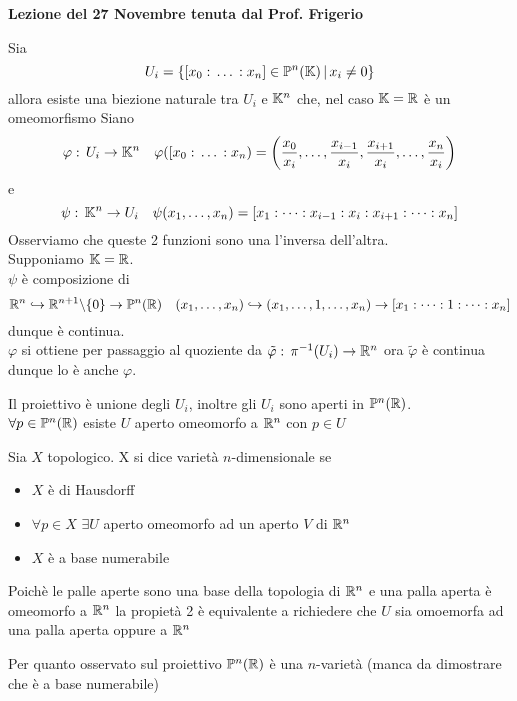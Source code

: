 


\textbf{Lezione del 27 Novembre tenuta dal Prof. Frigerio}
\begin{prop}Sia 
$$ U_i = \{ [x_0:\, \dots \, : x_n ] \in \mathbb{P}^n(\mathbb{K}) \, \vert \, x_i \neq 0 \} $$
allora esiste una biezione naturale tra $U_i$ e $\mathbb{K}^n$ che, nel caso $\mathbb{K}=\mathbb{R}$ \`e un omeomorfismo 
\proof Siano
$$ \varphi:\, U_i \to \mathbb{K}^n \quad \varphi([x_0:\, \dots \, : x_n) = \left( \frac{x_0}{x_i}, \dots , \frac{x_{i-1}}{x_i}, \frac{x_{i+1}}{x_i}, \dots , \frac{x_n }{x_i} \right)$$
e 
$$ \psi:\, \mathbb{K}^n \to U_i \quad \psi( x_1, \dots , x_n ) = [ x_1 : \dots :x_{i-1}: x_i : x_{i+1} : \dots : x_n]$$
Osserviamo che queste 2 funzioni sono una l'inversa dell'altra.\\
Supponiamo $\mathbb{K}=\mathbb{R}$.\\
$ \psi $ \`e composizione di 
$$ \mathbb{R}^n \hookrightarrow \mathbb{R}^{n+1}\backslash \{ 0 \} \to \mathbb{P}^n(\mathbb{R}) \quad (x_1, \dots, x_n ) \hookrightarrow (x_1, \dots, 1 ,  \dots , x_n ) \to [ x_1 : \dots : 1: \dots : x_n ]$$
dunque \`e continua.\\
$\varphi$ si ottiene per passaggio al quoziente da $ \tilde{\varphi}:\, \pi^{-1}(U_i) \to \mathbb{R}^n $ ora $\tilde{\varphi}$ \`e continua dunque lo \`e anche $\varphi$.\endproof
\end{prop}
\begin{oss}Il proiettivo \`e unione degli $U_i$, inoltre 
gli $U_i$ sono aperti in $\mathbb{P}^n(\mathbb{R})$.\\
$\forall p \in \mathbb{P}^n(\mathbb{R})$ esiste $U$ aperto omeomorfo a $\mathbb{R}^n$ con $p\in U$
\end{oss}
\spazio
\begin{defn}Sia $X$ topologico. X si dice variet\`a $n$-dimensionale se 
\begin{itemize}
\item $X$ \`e di Hausdorff
\item $\forall p \in X$ $\exists U$ aperto omeomorfo ad un aperto $V$ di $\mathbb{R}^n$
\item $X$ \`e a base numerabile 
\end{itemize}
\begin{oss}Poich\`e le palle aperte sono una base della topologia di $\mathbb{R}^n$ e una palla aperta \`e omeomorfo a $\mathbb{R}^n$ la propiet\`a 2 \`e equivalente a richiedere che $U$ sia omoemorfa ad una palla aperta oppure a $\mathbb{R}^n$
\end{oss}
\end{defn}
\begin{oss}Per quanto osservato sul proiettivo $\mathbb{P}^n(\mathbb{R})$ \`e una $n$-variet\`a (manca da dimostrare che \`e a base numerabile)
\end{oss}

